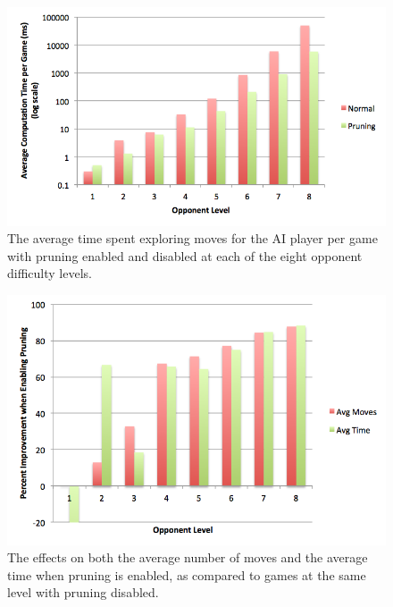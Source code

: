 \documentclass{article}
\begin{document}
\begin{doublespace}
\begin{figure}[ht!]
\centering
\includegraphics[width=6.5in]{../Data/Graphs/Graph3}
\caption{The average time spent exploring moves for the AI player per game with pruning enabled and disabled at each of the eight opponent difficulty levels.}
\end{figure}

\begin{figure}[ht!]
\centering
\includegraphics[width=6.5in]{../Data/Graphs/Graph1}
\caption{The effects on both the average number of moves and the average time when pruning is enabled, as compared to games at the same level with pruning disabled.}
\end{figure}


\end{doublespace}
\end{document}

